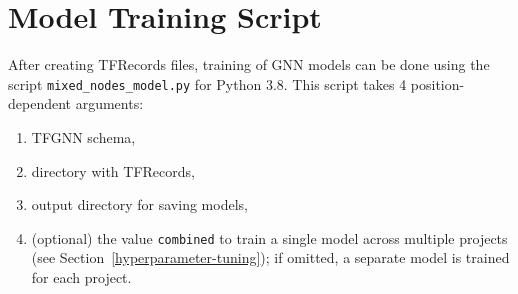 \section{Model Training Script}
\label{implementation-training}
After creating TFRecords files, training of GNN models can be done using the script \texttt{mixed\_nodes\_model.py} for Python 3.8. This script takes 4 position-dependent arguments:
\begin{enumerate}
    \item TFGNN schema,
    \item directory with TFRecords,
    \item output directory for saving models,
    \item (optional) the value \texttt{combined} to train a single model across multiple projects (see Section~\ref{hyperparameter-tuning}); if omitted, a separate model is trained for each project.
\end{enumerate}

